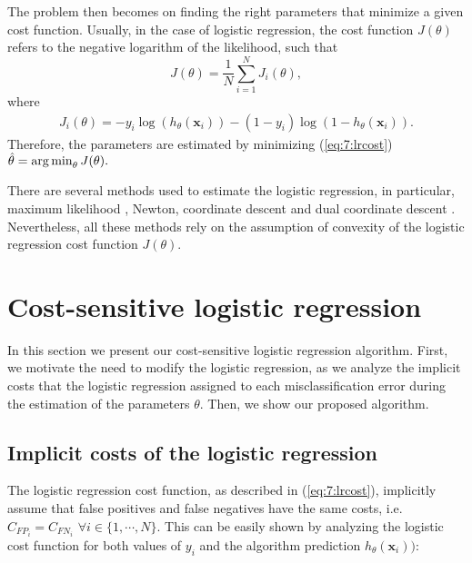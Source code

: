 The problem then becomes on finding the right parameters that minimize a given cost function.   
Usually, in the case of logistic regression, the cost function $J(\theta)$ refers to the negative   
logarithm of the likelihood, such that
\begin{equation}
  J(\theta)=\frac{1}{N}\sum_{i=1}^{N} J_i(\theta),
\end{equation}
where
\begin{align}\label{eq:7:lrcost}
  J_i(\theta) =  -y_i\log(h_\theta(\mathbf{x}_i)) -(1-y_i)\log(1-h_\theta(\mathbf{x}_i)).
\end{align}
Therefore, the parameters are estimated by minimizing (\ref{eq:7:lrcost})
$
  \hat \theta = \operatorname*{arg\,min}_\theta J(\theta).
$

There are several methods used to estimate the logistic regression, in particular, maximum 
likelihood \citep{Hastie2009}, Newton, coordinate descent \citep{Murphy2012} and dual coordinate 
descent \citep{Yu2011}. Nevertheless, all these methods rely on the assumption of convexity of the 
logistic regression cost function $J(\theta)$. 


\section{Cost-sensitive logistic regression}
\label{sec:7:cslr}

In this section we present our cost-sensitive logistic regression algorithm.
First, we motivate the need to modify the logistic regression, as we 
analyze the implicit costs that the logistic regression assigned to each misclassification error 
during the estimation of the parameters $\theta$. Then, we show our proposed algorithm.


\subsection{Implicit costs of the logistic regression}
\label{sec:7:log_cost_analysis}

The logistic regression cost function, as described in (\ref{eq:7:lrcost}), implicitly assume that 
false positives and false negatives have the same costs, i.e. $C_{{FP}_i} = C_{{FN}_i}$ $\forall 
i \in \{1,\cdots,N\}$. This can be easily shown by analyzing the logistic cost function for both 
values of $y_i$ and the algorithm prediction $h_\theta(\mathbf{x}_i))$:

